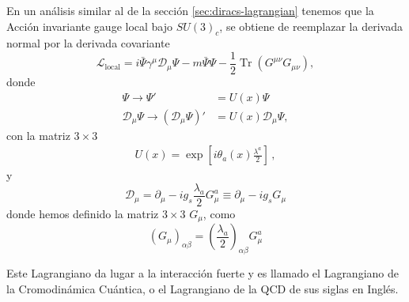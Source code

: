 En un análisis similar al de la sección \ref{sec:diracs-lagrangian} tenemos que la Acción invariante gauge local bajo $SU(3)_c$, se obtiene de reemplazar la derivada normal por la derivada covariante 
\begin{equation}
  \label{eq:127qft}
  \mathcal{L}_{\text{local}}=i\bar{\Psi}\gamma^\mu\mathcal{D}_\mu\Psi-m\bar{\Psi}\Psi
  -\frac{1}{2}\operatorname{Tr}\left({G}^{\mu\nu}{G}_{\mu\nu}\right),
\end{equation}
donde
\begin{align}
  \label{eq:qcdtr}
  \Psi\to \Psi'&=U(x)\Psi\nonumber\\
  \mathcal{D}_\mu\Psi\to \left(\mathcal{D}_\mu\Psi\right)'&
  =U(x)\mathcal{D}_\mu\Psi,
\end{align}
con la matriz $3\times 3$
\begin{align}
  U(x)=\exp\left[i\theta_a(x)\frac{\lambda^a}{2}\right]\,,
\end{align}
y
\begin{equation}
  \mathcal{D}_\mu=\partial_\mu-i g_s\frac{\lambda_a}{2}G_\mu^a\equiv\partial_\mu-i g_s {G}_\mu
\end{equation}
donde hemos definido la matriz $3\times 3$  $G_\mu$, como
\begin{equation}
  \left({G}_\mu\right)_{\alpha\beta}=\left(\frac{\lambda_a}{2}\right)_{\alpha\beta}G_\mu^a
\end{equation}

Este Lagrangiano da lugar a la interacción fuerte y es llamado el Lagrangiano de la Cromodinámica Cuántica, o el Lagrangiano de la QCD de sus siglas en Inglés.

